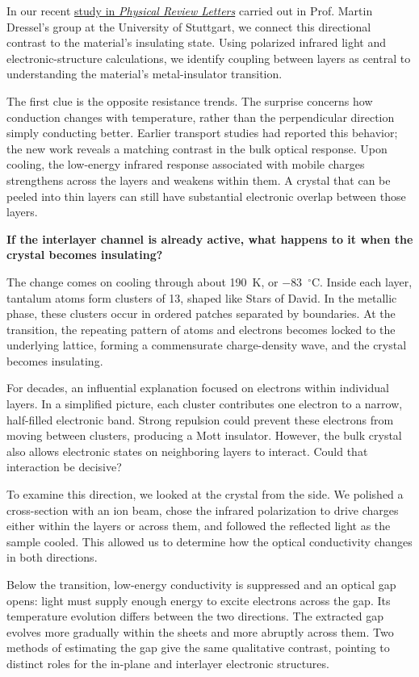 \documentclass[11pt,a4paper]{article}
\newcommand{\degC}{\ensuremath{^{\circ}\mathrm{C}}}
\begin{document}
In our recent \href{https://doi.org/10.1103/pwzn-m4d2}{study in \textit{Physical Review Letters}} carried out in Prof. Martin Dressel’s group at the University of Stuttgart, we connect this directional contrast to the material’s insulating state. Using polarized infrared light and electronic-structure calculations, we identify coupling between layers as central to understanding the material’s metal-insulator transition.

The first clue is the opposite resistance trends. The surprise concerns how conduction changes with temperature, rather than the perpendicular direction simply conducting better. Earlier transport studies had reported this behavior; the new work reveals a matching contrast in the bulk optical response. Upon cooling, the low-energy infrared response associated with mobile charges strengthens across the layers and weakens within them. A crystal that can be peeled into thin layers can still have substantial electronic overlap between those layers.



\textbf{If the interlayer channel is already active, what happens to it when the crystal becomes insulating?}

The change comes on cooling through about 190~K, or $-83$~\degC. Inside each layer, tantalum atoms form clusters of 13, shaped like Stars of David. In the metallic phase, these clusters occur in ordered patches separated by boundaries. At the transition, the repeating pattern of atoms and electrons becomes locked to the underlying lattice, forming a commensurate charge-density wave, and the crystal becomes insulating.

For decades, an influential explanation focused on electrons within individual layers. In a simplified picture, each cluster contributes one electron to a narrow, half-filled electronic band. Strong repulsion could prevent these electrons from moving between clusters, producing a Mott insulator. However, the bulk crystal also allows electronic states on neighboring layers to interact. Could that interaction be decisive?

To examine this direction, we looked at the crystal from the side. We polished a cross-section with an ion beam, chose the infrared polarization to drive charges either within the layers or across them, and followed the reflected light as the sample cooled. This allowed us to determine how the optical conductivity changes in both directions.

Below the transition, low-energy conductivity is suppressed and an optical gap opens: light must supply enough energy to excite electrons across the gap. Its temperature evolution differs between the two directions. The extracted gap evolves more gradually within the sheets and more abruptly across them. Two methods of estimating the gap give the same qualitative contrast, pointing to distinct roles for the in-plane and interlayer electronic structures.
\end{document}
